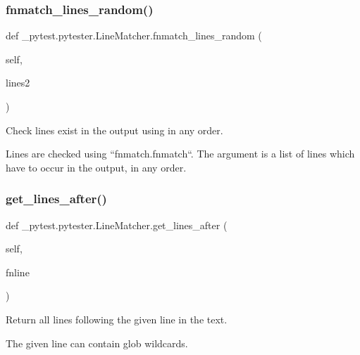 \subsubsection{\texorpdfstring{fnmatch\+\_\+lines\+\_\+random()}{fnmatch\_lines\_random()}}
{\footnotesize\ttfamily def \+\_\+pytest.\+pytester.\+Line\+Matcher.\+fnmatch\+\_\+lines\+\_\+random (\begin{DoxyParamCaption}\item[{}]{self,  }\item[{}]{lines2 }\end{DoxyParamCaption})}

\begin{DoxyVerb}Check lines exist in the output using in any order.

Lines are checked using ``fnmatch.fnmatch``. The argument is a list of
lines which have to occur in the output, in any order.\end{DoxyVerb}
 \mbox{\label{class__pytest_1_1pytester_1_1_line_matcher_a2841f2333c328cbd7b48ec18ce60baae}} 
\subsubsection{\texorpdfstring{get\+\_\+lines\+\_\+after()}{get\_lines\_after()}}
{\footnotesize\ttfamily def \+\_\+pytest.\+pytester.\+Line\+Matcher.\+get\+\_\+lines\+\_\+after (\begin{DoxyParamCaption}\item[{}]{self,  }\item[{}]{fnline }\end{DoxyParamCaption})}

\begin{DoxyVerb}Return all lines following the given line in the text.

The given line can contain glob wildcards.\end{DoxyVerb}
 \mbox{\label{class__pytest_1_1pytester_1_1_line_matcher_abfacaa8b4c4e97ec60df7b299126389e}} 
